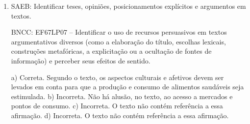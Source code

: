 \begin{enumerate}
\item
SAEB: Identificar teses, opiniões, posicionamentos explícitos e
argumentos em textos.

BNCC: EF67LP07 -- Identificar o uso de recursos persuasivos em textos
argumentativos diversos (como a elaboração do título, escolhas lexicais,
construções metafóricas, a explicitação ou a ocultação de fontes de
informação) e perceber seus efeitos de sentido.

a) Correta. Segundo o texto, os aspectos culturais e afetivos devem ser
levados em conta para que a produção e consumo de alimentos saudáveis
seja estimulada.
b) Incorreta. Não há alusão, no texto, ao acesso a mercados e pontos de consumo.
c) Incorreta. O texto não contém referência a essa afirmação.
d) Incorreta. O texto não contém referência a essa afirmação.

\end{enumerate}


